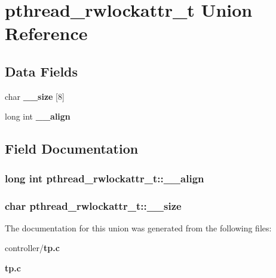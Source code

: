 \section{pthread\_\-rwlockattr\_\-t Union Reference}
\label{unionpthread__rwlockattr__t}
\subsection*{Data Fields}
\begin{DoxyCompactItemize}
\item 
char {\bf \_\-\_\-size} [8]
\item 
long int {\bf \_\-\_\-align}
\end{DoxyCompactItemize}


\subsection{Field Documentation}
\subsubsection[{\_\-\_\-align}]{\setlength{\rightskip}{0pt plus 5cm}long int {\bf pthread\_\-rwlockattr\_\-t::\_\-\_\-align}}\label{unionpthread__rwlockattr__t_a3ff3b27c974ddac3709268ac675ce850}
\subsubsection[{\_\-\_\-size}]{\setlength{\rightskip}{0pt plus 5cm}char {\bf pthread\_\-rwlockattr\_\-t::\_\-\_\-size}}\label{unionpthread__rwlockattr__t_a4b2f661513fe70c5971787f574ccb3dd}


The documentation for this union was generated from the following files:\begin{DoxyCompactItemize}
\item 
controller/{\bf tp.c}\item 
{\bf tp.c}\end{DoxyCompactItemize}
